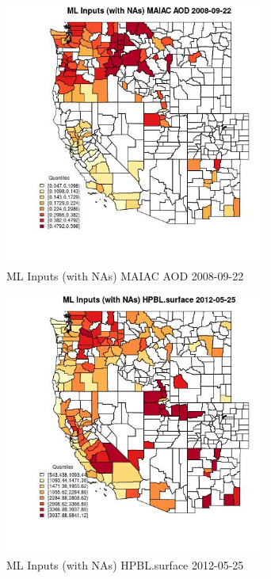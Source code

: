 \begin{figure} 
\centering  
\includegraphics[width=0.77\textwidth]{Code_Outputs/Report_ML_input_PM25_Step4_part_e_de_duplicated_aves_compiled_2019-05-18wNAs_CountyMAIAC_AODMean2008-09-22_2008-09-22.jpg} 
\caption{\label{fig:Report_ML_input_PM25_Step4_part_e_de_duplicated_aves_compiled_2019-05-18wNAsCountyMAIAC_AODMean2008-09-22_2008-09-22}ML Inputs (with NAs) MAIAC AOD 2008-09-22} 
\end{figure} 
 

\begin{figure} 
\centering  
\includegraphics[width=0.77\textwidth]{Code_Outputs/Report_ML_input_PM25_Step4_part_e_de_duplicated_aves_compiled_2019-05-18wNAs_CountyHPBLsurfaceMean2012-05-25_2012-05-25.jpg} 
\caption{\label{fig:Report_ML_input_PM25_Step4_part_e_de_duplicated_aves_compiled_2019-05-18wNAsCountyHPBLsurfaceMean2012-05-25_2012-05-25}ML Inputs (with NAs) HPBL.surface 2012-05-25} 
\end{figure} 
 

